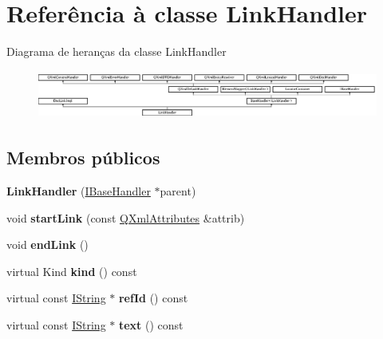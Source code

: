 \hypertarget{class_link_handler}{\section{Referência à classe Link\-Handler}
\label{class_link_handler}
}
Diagrama de heranças da classe Link\-Handler\begin{figure}[H]
\begin{center}
\leavevmode
\includegraphics[height=1.600000cm]{class_link_handler}
\end{center}
\end{figure}
\subsection*{Membros públicos}
\begin{DoxyCompactItemize}
\item 
\hypertarget{class_link_handler_a6a69557d8918d7af227e077b9eddcb3a}{{\bfseries Link\-Handler} (\hyperlink{class_i_base_handler}{I\-Base\-Handler} $\ast$parent)}\label{class_link_handler_a6a69557d8918d7af227e077b9eddcb3a}

\item 
\hypertarget{class_link_handler_a537fb712d08bab9c4ad5812a84f7a4b3}{void {\bfseries start\-Link} (const \hyperlink{class_q_xml_attributes}{Q\-Xml\-Attributes} \&attrib)}\label{class_link_handler_a537fb712d08bab9c4ad5812a84f7a4b3}

\item 
\hypertarget{class_link_handler_a195e23a7cfb9bc3cdc5e2fb4ca18d603}{void {\bfseries end\-Link} ()}\label{class_link_handler_a195e23a7cfb9bc3cdc5e2fb4ca18d603}

\item 
\hypertarget{class_link_handler_af8e62c8a81ddf2283205cc8955de50eb}{virtual Kind {\bfseries kind} () const }\label{class_link_handler_af8e62c8a81ddf2283205cc8955de50eb}

\item 
\hypertarget{class_link_handler_a2488ce15cc44de0c90c8f6116e9d5094}{virtual const \hyperlink{class_i_string}{I\-String} $\ast$ {\bfseries ref\-Id} () const }\label{class_link_handler_a2488ce15cc44de0c90c8f6116e9d5094}

\item 
\hypertarget{class_link_handler_a38ed11cab67ca9bf8d04302e53b86a69}{virtual const \hyperlink{class_i_string}{I\-String} $\ast$ {\bfseries text} () const }\label{class_link_handler_a38ed11cab67ca9bf8d04302e53b86a69}

\end{DoxyCompactItemize}

